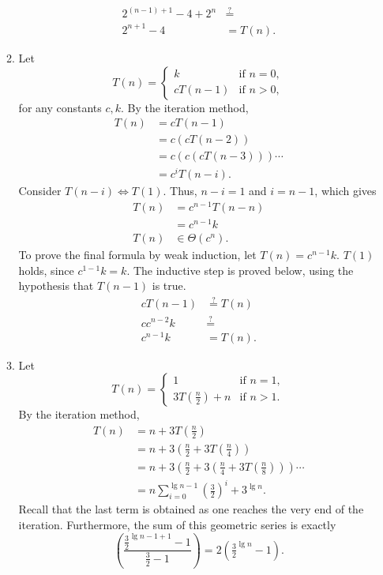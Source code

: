 \documentclass[12pt]{article}
\begin{document}
\begin{enumerate}
\begin{enumerate}
\begin{align*}
      2^{(n - 1) + 1} - 4 + 2^{n} &\stackrel{?}{=} \\
      2^{n + 1} - 4 &= T(n).
    \end{align*}
    \item\label{ex:4c} Let \[
      T(n) = \begin{cases}
        k &\text{if } n = 0, \\
        cT(n - 1) &\text{if } n > 0,
      \end{cases}
    \] for any constants $c, k$. By the iteration method,
    \begin{align*}
      T(n) &= cT(n - 1) \\
      &= c(cT(n - 2)) \\
      &= c(c(cT(n - 3))) \cdots \\
      &= c^{i} T(n - i).
    \end{align*}
    Consider $T(n - i) \Leftrightarrow T(1)$. Thus, $n - i = 1$ and $i = n - 1$, which gives
    \begin{align*}
      T(n) &= c^{n - 1} T(n - n)  \\
      &= c^{n - 1} k \\
      T(n) &\in \Theta(c^{n}).
    \end{align*}
    To prove the final formula by weak induction, let $T(n) = c^{n - 1} k$. $T(1)$ holds, since $c^{1 - 1} k = k$. The inductive step is proved below, using the hypothesis that $T(n - 1)$ is true.
    \begin{align*}
      cT(n - 1) &\stackrel{?}{=} T(n) \\
      c c^{n - 2} k &\stackrel{?}{=} \\
      c^{n - 1} k &= T(n). 
    \end{align*}
    \item\label{ex:4d} Let \[
      T(n) = \begin{cases}
        1 &\text{if } n = 1, \\
        3T(\frac{n}{2}) + n &\text{if } n > 1.
      \end{cases}
    \] By the iteration method,
    \begin{align*}
      T(n) &= n + 3T(\tfrac{n}{2}) \\
      &= n + 3(\tfrac{n}{2} + 3T(\tfrac{n}{4})) \\ 
      &= n + 3(\tfrac{n}{2} + 3(\tfrac{n}{4} + 3T(\tfrac{n}{8}))) \cdots \\
      &= n\sum_{i = 0}^{\lg n - 1} (\tfrac{3}{2})^{i} + 3^{\lg n}.
    \end{align*}
    Recall that the last term is obtained as one reaches the very end of the iteration. Furthermore, the sum of this geometric series is exactly \[\left(\frac{\frac{3}{2}^{\lg n - 1+ 1} - 1}{\frac{3}{2} - 1}\right) = 2(\tfrac{3}{2}^{\lg n} - 1).\]

\end{enumerate}
\end{enumerate}
\end{document}
